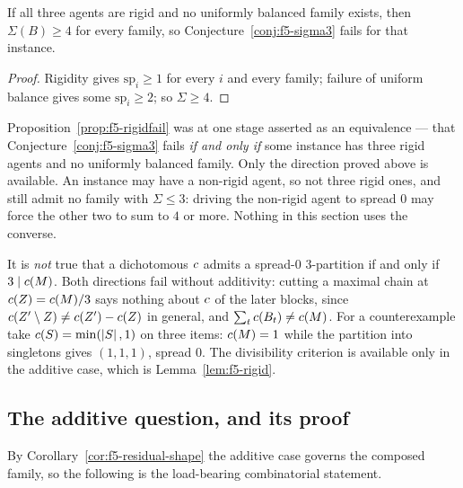 \begin{proposition}
\label{prop:f5-rigidfail}
If all three agents are rigid and no uniformly balanced family exists, then
$\Sigma(B) \ge 4$ for every family, so Conjecture~\ref{conj:f5-sigma3} fails for
that instance.
\end{proposition}

\begin{proof}
Rigidity gives $\mathrm{sp}_i \ge 1$ for every $i$ and every family; failure of
uniform balance gives some $\mathrm{sp}_i \ge 2$; so $\Sigma \ge 4$.
\end{proof}

\begin{remark}
\label{rem:f5-retract-iff}
Proposition~\ref{prop:f5-rigidfail} was at one stage asserted as an
equivalence --- that Conjecture~\ref{conj:f5-sigma3} fails \emph{if and only if}
some instance has three rigid agents and no uniformly balanced family. Only the
direction proved above is available. An instance may have a non-rigid agent, so
not three rigid ones, and still admit no family with $\Sigma \le 3$: driving the
non-rigid agent to spread $0$ may force the other two to sum to $4$ or more.
Nothing in this section uses the converse.
\end{remark}

\begin{remark}
\label{rem:f5-retract-div}
It is \emph{not} true that a dichotomous $c$ admits a spread-$0$
$3$-partition if and only if $3 \mid c(M)$. Both directions fail without
additivity: cutting a maximal chain at $c(Z) = c(M)/3$ says nothing
about $c$ of the later blocks, since
$c(Z' \setminus Z) \ne c(Z') - c(Z)$ in general, and
$\sum_t c(B_t) \ne c(M)$. For a counterexample take
$c(S) = \min(\left\lvert S\right\rvert,1)$ on three items: $c(M) = 1$ while the
partition into singletons gives $(1,1,1)$, spread $0$. The divisibility
criterion is available only in the additive case, which is
Lemma~\ref{lem:f5-rigid}.
\end{remark}

\subsection{The additive question, and its proof}
\label{sec:f5-Q}

By Corollary~\ref{cor:f5-residual-shape} the additive case governs the composed
family, so the following is the load-bearing combinatorial statement.


